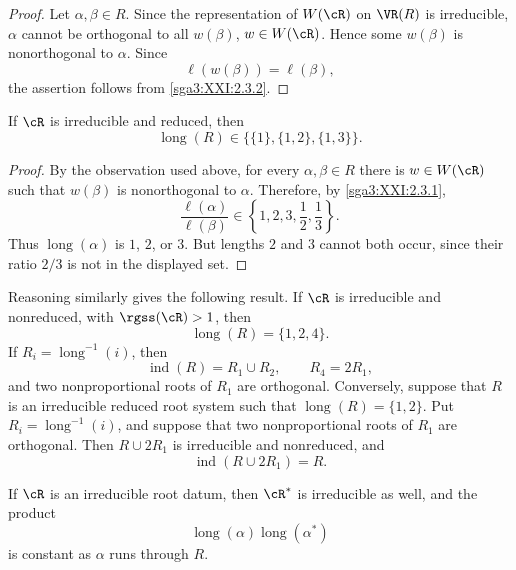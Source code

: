 \begin{proof}
Let \(\alpha,\beta\in R\). Since the representation of \(W(\cR)\)
on \(\VR(R)\) is irreducible, \(\alpha\) cannot be orthogonal to
all \(w(\beta)\), \(w\in W(\cR)\). Hence some \(w(\beta)\) is
nonorthogonal to \(\alpha\). Since
\[
 \ell(w(\beta))=\ell(\beta),
\]
the assertion follows from \ref{sga3:XXI:2.3.2}.
\end{proof}

\begin{lemma}\label{sga3:XXI:7.2.3}
If \(\cR\) is irreducible and reduced, then
\[
 \operatorname{long}(R)
 \in\bigl\{\{1\},\{1,2\},\{1,3\}\bigr\}.
\]
\end{lemma}

\begin{proof}
By the observation used above, for every
\(\alpha,\beta\in R\) there is \(w\in W(\cR)\) such that
\(w(\beta)\) is nonorthogonal to \(\alpha\). Therefore, by
\ref{sga3:XXI:2.3.1},
\[
 \frac{\ell(\alpha)}{\ell(\beta)}
 \in\left\{1,2,3,\frac12,\frac13\right\}.
\]
Thus \(\operatorname{long}(\alpha)\) is \(1\), \(2\), or \(3\).
But lengths \(2\) and \(3\) cannot both occur, since their ratio
\(2/3\) is not in the displayed set.
\end{proof}


\begin{remark}\label{sga3:XXI:7.2.4}
Reasoning similarly gives the following result.  If \(\cR\) is
irreducible and nonreduced, with \(\rgss(\cR)>1\), then
\[
 \operatorname{long}(R)=\{1,2,4\}.
\]
If \(R_i=\operatorname{long}^{-1}(i)\), then
\[
 \operatorname{ind}(R)=R_1\cup R_2,\qquad R_4=2R_1,
\]
and two nonproportional roots of \(R_1\) are orthogonal.
Conversely, suppose that \(R\) is an irreducible reduced root
system such that \(\operatorname{long}(R)=\{1,2\}\).  Put
\(R_i=\operatorname{long}^{-1}(i)\), and suppose that two
nonproportional roots of \(R_1\) are orthogonal.  Then
\(R\cup2R_1\) is irreducible and nonreduced, and
\[
 \operatorname{ind}(R\cup2R_1)=R.
\]
\end{remark}

\begin{lemma}\label{sga3:XXI:7.2.5}
If \(\cR\) is an irreducible root datum, then \(\cR^\ast\) is
irreducible as well, and the product
\[
 \operatorname{long}(\alpha)\operatorname{long}(\alpha^\ast)
\]
is constant as \(\alpha\) runs through \(R\).
\end{lemma}

